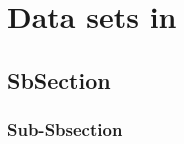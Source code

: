 \section{Data sets in \pp}
\label{sec:Section02}

\subsection{SbSection}
\label{sec:Section02.a-}

\subsubsection{Sub-Sbsection}